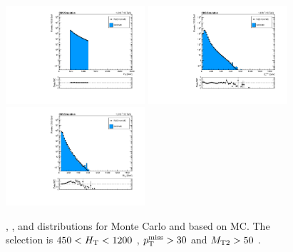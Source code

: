 \begin{figure}[htbp]
  \begin{center}
    \includegraphics[width=0.46\textwidth]{figs/qcd/rs_mc/lowht_ht.pdf}
    \includegraphics[width=0.46\textwidth]{figs/qcd/rs_mc/lowht_met.pdf} \\
    \includegraphics[width=0.46\textwidth]{figs/qcd/rs_mc/lowht_mt2.pdf}
    \caption{\Ht, \ptmiss, and \mttwo distributions for Monte Carlo and \rs based on MC. The selection is $450 < H_{\mathrm{T}} < 1200$ \GeV, $p_{\mathrm{T}}^{\mathrm{miss}} > 30$ \GeV and $M_{\mathrm{T2}} > 50$ \GeV.
            }
    \label{Fig:rs_mc_ht_met_lowht}
  \end{center}
\end{figure}

